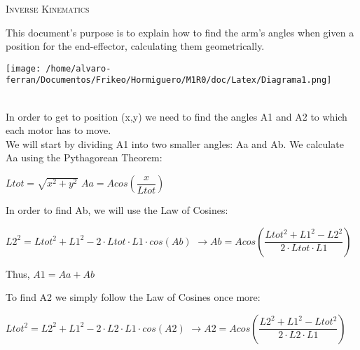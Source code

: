 \documentclass[11pt]{article}
\begin{document}
\thispagestyle{empty}

\begin{center}

 \textsc{\Huge Inverse Kinematics}\\

\vspace{-3.5cm} 

\end{center}

\vspace{2cm} 
\bigskip \flushleft

This document's purpose is to explain how to find the arm's angles when given a position for the end-effector, calculating them geometrically.\\

\begin{minipage}[]{\linewidth}%
\center \texttt{[image: /home/alvaro-ferran/Documentos/Frikeo/Hormiguero/M1R0/doc/Latex/Diagrama1.png]}
\end{minipage}
\\[0.5cm]
In order to get to position (x,y) we need to find the angles A1 and A2 to which each motor has to move. \\We will start by dividing A1 into two smaller angles: Aa and Ab.
We calculate Aa using the Pythagorean Theorem:

\center $Ltot=\sqrt{x^2+y^2}$
\center $Aa=Acos(\dfrac{x}{Ltot})$

\bigskip 
\flushleft
In order to find Ab, we will use the Law of Cosines:

\center $L2^2=Ltot^2+L1^2-2\cdot Ltot\cdot L1\cdot cos(Ab)$
\center $\rightarrow Ab= Acos(\dfrac{Ltot^2+L1^2-L2^2}{2\cdot Ltot\cdot L1} )$

\flushleft
\bigskip
Thus, 
\center $A1=Aa+Ab$

\newpage 
\thispagestyle{empty}
\flushleft
To find A2 we simply follow the Law of Cosines once more:

\center $Ltot^2=L2^2+L1^2-2\cdot L2\cdot L1\cdot cos(A2)$
\center $\rightarrow A2= Acos(\dfrac{L2^2+L1^2-Ltot^2}{2\cdot L2\cdot L1} )$
\end{document}
